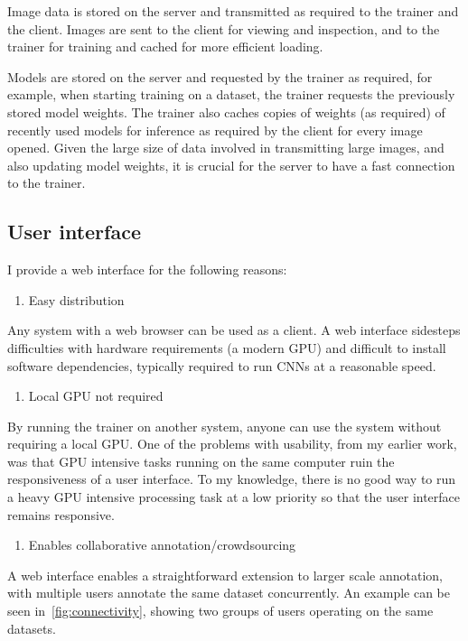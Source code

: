 Image data is stored on the server and transmitted as required to the trainer and the client. Images are sent to the client for viewing and inspection, and to the trainer for training and cached for more efficient loading. 

Models are stored on the server and requested by the trainer as required, for example, when starting training on a dataset, the trainer requests the previously stored model weights. The trainer also caches copies of weights (as required) of recently used models for inference as required by the client for every image opened. Given the large size of data involved in transmitting large images, and also updating model weights, it is crucial for the server to have a fast connection to the trainer.

\subsection {User interface}

I provide a web interface for the following reasons:

\begin{enumerate}
    \item Easy distribution
\end{enumerate}
Any system with a web browser can be used as a client. A web interface sidesteps difficulties with hardware requirements (a modern \gls{GPU}) and difficult to install software dependencies, typically required to run \gls{CNN}s at a reasonable speed.
\begin{enumerate}[resume]
    \item Local GPU not required
\end{enumerate}
By running the trainer on another system, anyone can use the system without requiring a local GPU. One of the problems with usability, from my earlier work, was that GPU intensive tasks running on the same computer ruin the responsiveness of a user interface. To my knowledge, there is no good way to run a heavy \gls{GPU} intensive processing task at a low priority so that the user interface remains responsive.
\begin{enumerate}[resume]
    \item Enables collaborative annotation/crowdsourcing
\end{enumerate}
A web interface enables a straightforward extension to larger scale annotation, with multiple users annotate the same dataset concurrently. An example can be seen in~\ref{fig:connectivity}, showing two groups of users operating on the same datasets.



